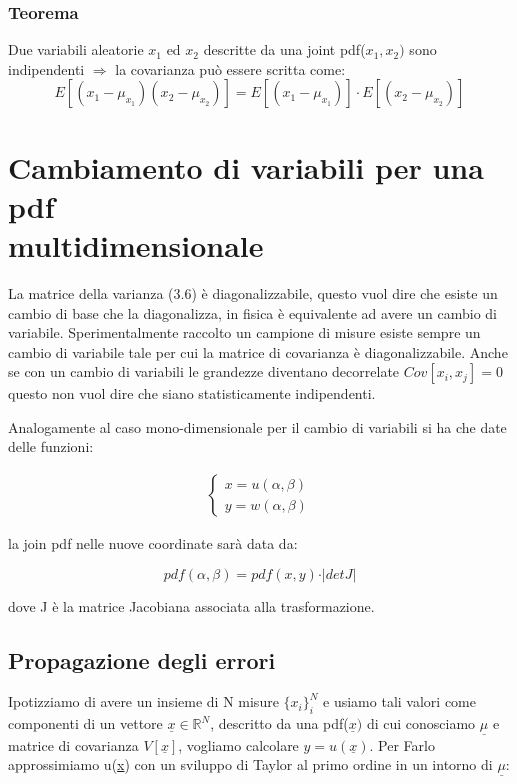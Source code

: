 \subsubsection{Teorema}
Due variabili aleatorie $x_1$ ed $x_2$ descritte da una joint pdf($x_1,x_2)$ sono indipendenti $\Rightarrow$ la covarianza pu\`{o} essere scritta come:
\begin{equation}
	E[(x_1-\mu_{x_1})(x_2 - \mu_{x_2})] = E[(x_1-\mu_{x_1})] \cdot E[(x_2 - \mu_{x_2})]
\end{equation}
 
\section{Cambiamento di variabili per una pdf \\ multidimensionale}

La matrice della varianza (3.6) \`{e} diagonalizzabile, questo vuol dire che esiste un cambio di base che la diagonalizza, in fisica \`{e} equivalente ad avere un cambio di variabile. Sperimentalmente raccolto un campione di misure esiste sempre un cambio di variabile tale per cui la matrice di covarianza \`{e} diagonalizzabile. Anche se con un cambio di variabili le grandezze diventano decorrelate $Cov[x_i,x_j] = 0$ questo non vuol dire che siano statisticamente indipendenti.

Analogamente al caso mono-dimensionale per il cambio di variabili si ha che date delle funzioni:

\begin{align*}
	\begin{cases}
		x = u(\alpha,\beta)\\
		y = w(\alpha, \beta)
	\end{cases}
\end{align*}

la join pdf nelle nuove coordinate sar\`{a} data da:

\begin{equation}
	pdf(\alpha, \beta) = pdf(x,y) \cdot \vert detJ\vert
\end{equation}

dove J \`{e} la matrice Jacobiana associata alla trasformazione.
\subsection{Propagazione degli errori}

Ipotizziamo di avere un insieme di N misure $\{x_i\}_i^N$ e usiamo tali valori come componenti di un vettore $\underline{x} \in \mathbb{R}^N$, descritto da una pdf($\underline{x})$ di cui conosciamo $\underline{\mu}$ e matrice di covarianza $V[\underline{x}]$, vogliamo calcolare $y = u(\underline{x})$. Per Farlo approssimiamo u(\underline{x}) con un sviluppo di Taylor al primo ordine in un intorno di $\underline{\mu}$:

